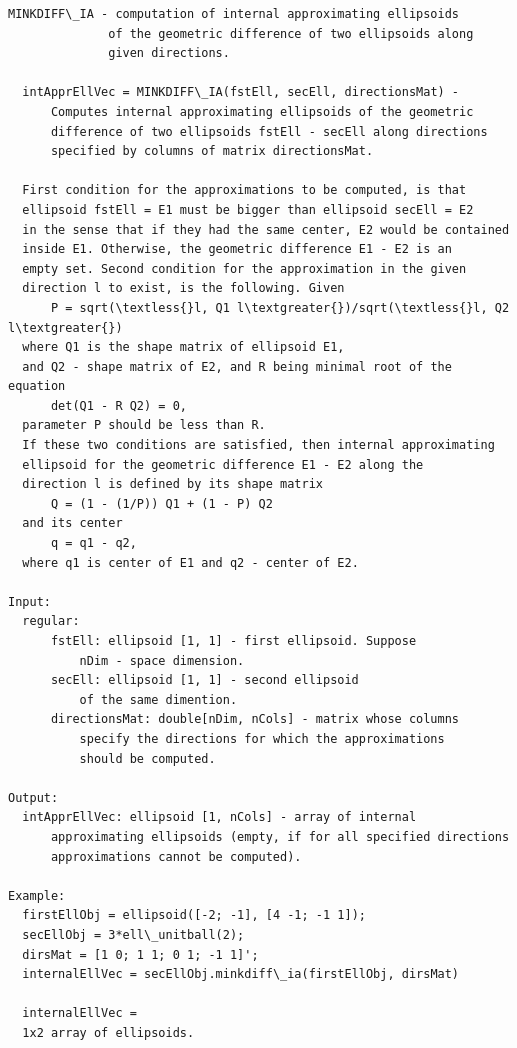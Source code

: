 \documentclass[letterpaper,10pt,english]{sphinxmanual}
\begin{document}
\begin{Verbatim}[commandchars=\\\{\}]
MINKDIFF\_IA - computation of internal approximating ellipsoids
              of the geometric difference of two ellipsoids along
              given directions.

  intApprEllVec = MINKDIFF\_IA(fstEll, secEll, directionsMat) -
      Computes internal approximating ellipsoids of the geometric
      difference of two ellipsoids fstEll - secEll along directions
      specified by columns of matrix directionsMat.

  First condition for the approximations to be computed, is that
  ellipsoid fstEll = E1 must be bigger than ellipsoid secEll = E2
  in the sense that if they had the same center, E2 would be contained
  inside E1. Otherwise, the geometric difference E1 - E2 is an
  empty set. Second condition for the approximation in the given
  direction l to exist, is the following. Given
      P = sqrt(\textless{}l, Q1 l\textgreater{})/sqrt(\textless{}l, Q2 l\textgreater{})
  where Q1 is the shape matrix of ellipsoid E1,
  and Q2 - shape matrix of E2, and R being minimal root of the equation
      det(Q1 - R Q2) = 0,
  parameter P should be less than R.
  If these two conditions are satisfied, then internal approximating
  ellipsoid for the geometric difference E1 - E2 along the
  direction l is defined by its shape matrix
      Q = (1 - (1/P)) Q1 + (1 - P) Q2
  and its center
      q = q1 - q2,
  where q1 is center of E1 and q2 - center of E2.

Input:
  regular:
      fstEll: ellipsoid [1, 1] - first ellipsoid. Suppose
          nDim - space dimension.
      secEll: ellipsoid [1, 1] - second ellipsoid
          of the same dimention.
      directionsMat: double[nDim, nCols] - matrix whose columns
          specify the directions for which the approximations
          should be computed.

Output:
  intApprEllVec: ellipsoid [1, nCols] - array of internal
      approximating ellipsoids (empty, if for all specified directions
      approximations cannot be computed).

Example:
  firstEllObj = ellipsoid([-2; -1], [4 -1; -1 1]);
  secEllObj = 3*ell\_unitball(2);
  dirsMat = [1 0; 1 1; 0 1; -1 1]';
  internalEllVec = secEllObj.minkdiff\_ia(firstEllObj, dirsMat)

  internalEllVec =
  1x2 array of ellipsoids.
\end{Verbatim}
\end{document}

